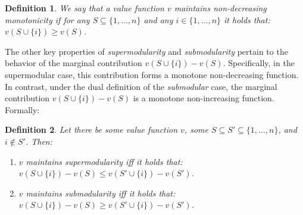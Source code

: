 \documentclass{article}
\newtheorem{definition}{Definition}
\begin{document}
\begin{definition}
    We say that a value function $v$ maintains \emph{non-decreasing monotonicity} if for any $S\subseteq\{1,\ldots,n\}$ and any $i\in\{1,\ldots,n\}$ it holds that: $v(S\cup\{i\})\geq v(S)$. 
\end{definition}






The other key properties of \emph{supermodularity} and \emph{submodularity} pertain to the behavior of the marginal contribution $v(S \cup \{i\}) - v(S)$. Specifically, in the supermodular case, this contribution forms a monotone non-decreasing function. In contrast, under the dual definition of the \emph{submodular} case, the marginal contribution $v(S \cup \{i\}) - v(S)$ is a monotone non-increasing function. Formally:


\begin{definition}
    Let there be some value function $v$, some $S\subseteq S'\subseteq\{1,\ldots,n\}$, and $i\not\in S'$. Then: 
    \begin{enumerate}
        \item $v$ maintains \emph{supermodularity} iff it holds that: $v(S\cup\{i\})-v(S)\leq v(S'\cup\{i\})-v(S')$.
        \item $v$ maintains \emph{submodularity} iff it holds that: $v(S\cup\{i\})-v(S)\geq v(S'\cup\{i\})-v(S')$.
    \end{enumerate}
\end{definition}
\end{document}
